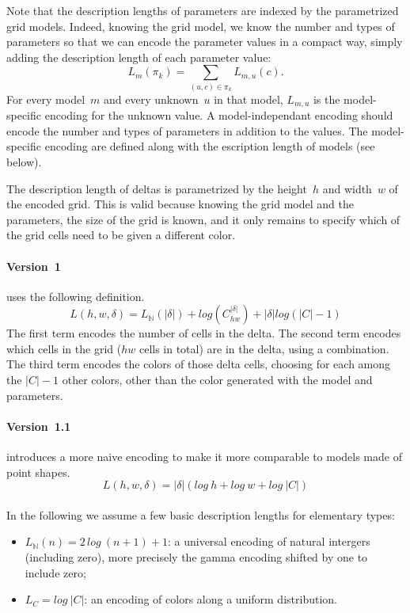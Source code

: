 \documentclass[a4paper]{llncs}
\newcommand{\nat}{\mathbb{N}}
\begin{document}
Note that the description lengths of parameters are indexed by the
parametrized grid models. Indeed, knowing the grid model, we know the
number and types of parameters so that we can encode the parameter
values in a compact way, simply adding the description length of each
parameter value:
\[ L_m(\pi_k) = \sum_{(u,c) \in \pi_k} L_{m,u}(c). \] For every
model~$m$ and every unknown~$u$ in that model, $L_{m,u}$ is the
model-specific encoding for the unknown value. A model-independant
encoding should encode the number and types of parameters in addition
to the values. The model-specific encoding are defined along with the
escription length of models (see below).

The description length of deltas is parametrized by the height~$h$ and
width~$w$ of the encoded grid. This is valid because knowing the grid
model and the parameters, the size of the grid is known, and it only
remains to specify which of the grid cells need to be given a
different color.

\paragraph{Version~1 } uses the following definition.
\[ L(h,w,\delta) = L_\nat(|\delta|) + log(C_{hw}^{|\delta|}) + |\delta|log(|C|-1) \]
%
The first term encodes the number of cells in the delta. The second
term encodes which cells in the grid ($hw$ cells in total) are in the
delta, using a combination. The third term encodes the colors of those
delta cells, choosing for each among the $|C|-1$ other colors, other
than the color generated with the model and parameters.

\paragraph{Version~1.1} introduces a more naive encoding to make it
more comparable to models made of point shapes.
\[ L(h,w,\delta) = |\delta|(log\ h + log\ w + log\ |C|) \]

\paragraph{}
In the following we assume a few basic description lengths for
elementary types:
\begin{itemize}
\item $L_\nat(n) = 2\,log\ (n+1) + 1$: a universal encoding of natural
  intergers (including zero), more precisely the gamma encoding
  shifted by one to include zero;
\item $L_C = log\ |C|$: an encoding of colors along a uniform distribution.
\end{itemize}
\end{document}
